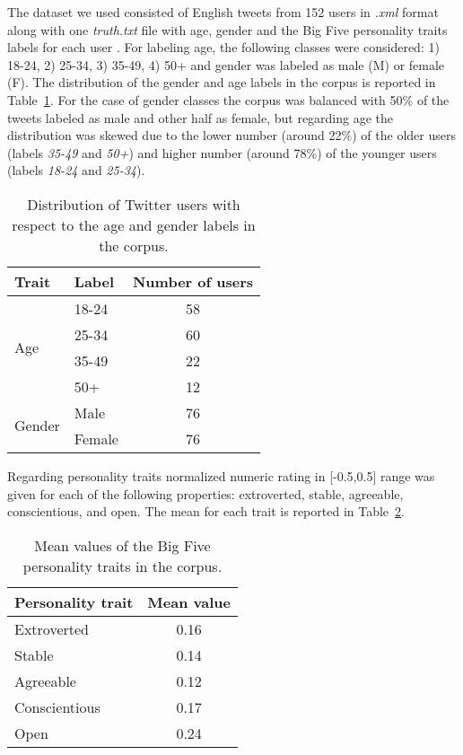 \documentclass[10pt, a4paper]{article}
\begin{document}
The dataset we used consisted of English tweets from 152 users in \textit{.xml} format along with one \textit{truth.txt} file with age, gender and the Big Five personality traits labels for each user \citep{dataset2015} . For labeling age, the following classes were considered: 1) 18-24, 2) 25-34, 3) 35-49, 4) 50+ and gender was labeled as male (M) or female (F). The distribution of the gender and age labels in the corpus is reported in Table~\ref{tab:narrow-table-1}. For the case of gender classes the corpus was balanced with 50\% of the tweets labeled as male and other half as female, but regarding age the distribution was skewed due to the lower number (around 22\%) of the older users (labels \textit{35-49} and \textit{50+}) and higher number (around 78\%) of the younger users (labels \textit{18-24} and \textit{25-34}).
\begin{table}[h]
\caption{Distribution of Twitter users with respect to the age and gender labels in the corpus.}
\label{tab:narrow-table-1}
\vspace{-3mm}
\begin{center}
\begin{tabular}{llc}
\toprule
Trait & Label & Number of users\\
\midrule
\multirow{4}{*}{Age}
		&18-24   & 58\\
    &25-34   & 60\\
    &35-49   & 22\\
    &50+   & 12\\
\midrule
\multirow{2}{*}{Gender}
		&Male   & 76\\
    &Female & 76\\
\bottomrule
\end{tabular}
\end{center}
\end{table}

Regarding personality traits normalized numeric rating in [-0.5,0.5] range was given for each of the following properties:  extroverted, stable, agreeable, conscientious, and open. The mean for each trait is reported in Table~\ref{tab:narrow-table-2}.
\begin{table}[h]
\caption{Mean values of the Big Five personality traits in the corpus.}
\label{tab:narrow-table-2}
\vspace{-3mm}
\begin{center}
\begin{tabular}{lc}
\toprule
Personality trait & Mean value\\
\midrule
Extroverted  & 0.16\\
Stable   & 0.14\\
Agreeable  & 0.12\\
Conscientious     & 0.17\\
Open     & 0.24\\
\bottomrule
\end{tabular}
\end{center}
\end{table}
\end{document}

